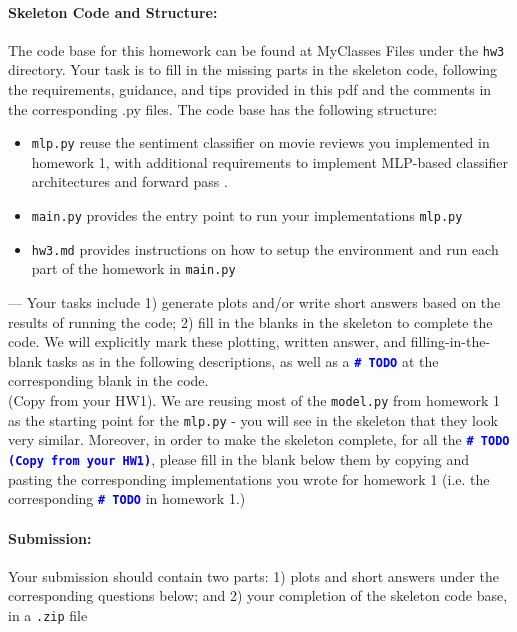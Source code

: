 \noindent \paragraph{Skeleton Code and Structure:}
The code base for this homework can be found at MyClasses Files under the \texttt{hw3} directory. Your task is to fill in the missing parts in the skeleton code, following the requirements, guidance, and tips provided in this pdf and the comments in the corresponding .py files.
The code base has the following structure:
\begin{itemize}
    \item \texttt{mlp.py} reuse the sentiment classifier on movie reviews you implemented in homework 1, with additional requirements to implement MLP-based classifier architectures and forward pass .
    \item \texttt{main.py} provides the entry point to run your implementations \texttt{mlp.py}
    \item \texttt{hw3.md} provides instructions on how to setup the environment and run each part of the homework in \texttt{main.py}
\end{itemize}

\noindent \todo{} ---
Your tasks include
1) generate plots and/or write short answers based on the results of running the code; 2) fill in the blanks in the skeleton to complete the code. We will explicitly mark these plotting, written answer, and filling-in-the-blank tasks as \todo{} in the following descriptions, as well as a \textcolor{blue}{\texttt{\textbf{\#~TODO}}} at the corresponding blank in the code. \\

\noindent \todo{} (Copy from your HW1). We are reusing most of the \texttt{model.py} from homework 1 as the starting point for the \texttt{mlp.py} - you will see in the skeleton that they look very similar. Moreover, in order to make the skeleton complete, for all the \textcolor{blue}{\texttt{\textbf{\#~TODO (Copy from your HW1)}}}, please fill in the blank below them by copying and pasting the corresponding implementations you wrote for homework 1 (i.e. the corresponding \textcolor{blue}{\texttt{\textbf{\#~TODO}}} in homework 1.)

\noindent \paragraph{Submission:} Your submission should contain two parts: 1) plots and short answers under the corresponding questions below; and 2) your completion of the skeleton code base, in a \texttt{.zip} file

